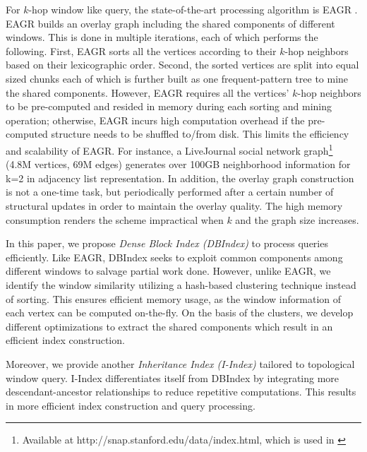 For $k$-hop window like query, the state-of-the-art processing algorithm
is EAGR \cite{mondal2014eagr}. EAGR builds an overlay graph including 
the shared components of different windows. This is done 
in multiple iterations, each of which performs the following.
First, EAGR sorts all the vertices according to their $k$-hop 
neighbors based on their lexicographic order. 
Second, the sorted vertices are split into equal sized chunks each of which is further built as one frequent-pattern tree to mine the shared components. 
However, EAGR requires all the vertices' $k$-hop 
neighbors to be pre-computed and resided in memory during 
each sorting and mining operation;
otherwise, EAGR incurs high computation overhead if the pre-computed structure needs to be shuffled to/from disk.
This limits the efficiency and scalability of EAGR.
 For instance, 
a LiveJournal social network graph\footnote{Available at http://snap.stanford.edu/data/index.html, which is used in \cite{mondal2014eagr}} 
(4.8M vertices, 69M edges) generates over 100GB neighborhood information 
for k=2 in adjacency list representation. In addition, the overlay graph construction is not a one-time task,
but periodically performed after a certain number of structural updates in order to maintain the overlay quality. The high memory consumption renders the scheme impractical 
when $k$ and the graph size increases.

In this paper,
we propose \textit{Dense Block Index (DBIndex)} 
to process queries efficiently.
Like EAGR, DBIndex seeks to exploit common
components among different windows to salvage 
partial work done. However, unlike EAGR,
we identify the window similarity utilizing a hash-based 
clustering technique instead of sorting. This ensures 
efficient memory usage, as the window information of each vertex can 
be computed on-the-fly. On the basis of the clusters, we develop different optimizations 
to extract the shared components which result in an efficient index construction. 

Moreover, we provide another \emph{Inheritance Index (I-Index)} tailored 
to topological window query. I-Index differentiates itself from
DBIndex by integrating more descendant-ancestor relationships 
to reduce repetitive computations. This results in
more efficient index construction and query processing.  

